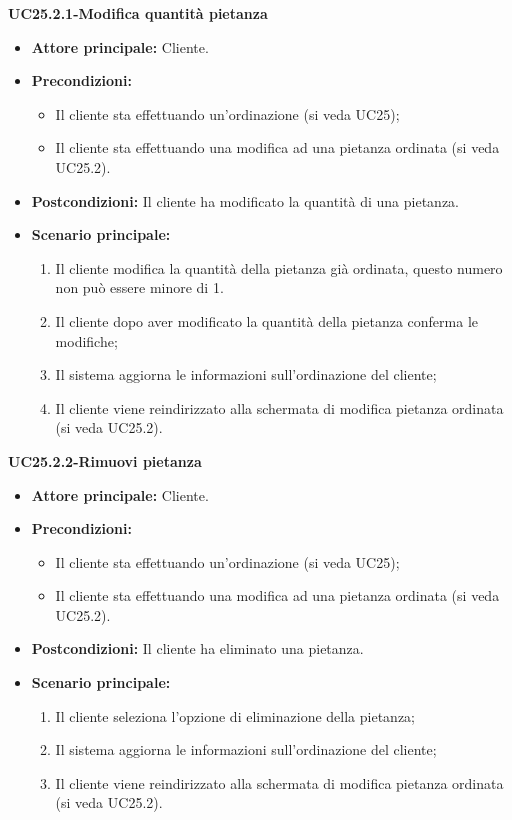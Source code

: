 \textbf{UC25.2.1-Modifica quantità pietanza}
\begin{itemize}
\item \textbf{Attore principale:} Cliente.
\item \textbf{Precondizioni:} 
\begin{itemize}
    \item Il cliente sta effettuando un'ordinazione (si veda UC25);
    \item Il cliente sta effettuando una modifica ad una pietanza ordinata (si veda UC25.2).
\end{itemize}
\item \textbf{Postcondizioni:} Il cliente ha modificato la quantità di una pietanza.
\item \textbf{Scenario principale:}
\begin{enumerate}
    \item Il cliente modifica la quantità della pietanza già ordinata, questo numero non può essere minore di 1.
    \item Il cliente dopo aver modificato la quantità della pietanza conferma le modifiche;
    \item Il sistema aggiorna le informazioni sull'ordinazione del cliente;
    \item Il cliente viene reindirizzato alla schermata di modifica pietanza ordinata (si veda UC25.2).
\end{enumerate}
\end{itemize}

\textbf{UC25.2.2-Rimuovi pietanza}
\begin{itemize}
\item \textbf{Attore principale:} Cliente.
\item \textbf{Precondizioni:} 
\begin{itemize}
    \item Il cliente sta effettuando un'ordinazione (si veda UC25);
    \item Il cliente sta effettuando una modifica ad una pietanza ordinata (si veda UC25.2).
\end{itemize}
\item \textbf{Postcondizioni:} Il cliente ha eliminato una pietanza.
\item \textbf{Scenario principale:}
\begin{enumerate}
    \item Il cliente seleziona l'opzione di eliminazione della pietanza;
    \item Il sistema aggiorna le informazioni sull'ordinazione del cliente;
    \item Il cliente viene reindirizzato alla schermata di modifica pietanza ordinata (si veda UC25.2).
\end{enumerate}
\end{itemize}

